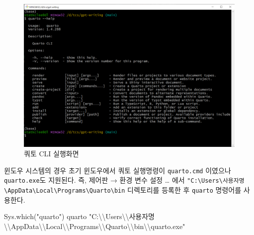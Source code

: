 \documentclass[
  letterpaper,
]{book}
\newenvironment{Shaded}{\begin{snugshade}}{\end{snugshade}}
\newcommand{\FunctionTok}[1]{\textcolor[rgb]{0.28,0.35,0.67}{#1}}
\newcommand{\NormalTok}[1]{\textcolor[rgb]{0.00,0.23,0.31}{#1}}
\newcommand{\SpecialCharTok}[1]{\textcolor[rgb]{0.37,0.37,0.37}{#1}}
\newcommand{\StringTok}[1]{\textcolor[rgb]{0.13,0.47,0.30}{#1}}
\begin{document}
\begin{figure}

{\centering \includegraphics{images/quarto-cli.png}

}

\caption{쿼토 CLI 실행화면}

\end{figure}

\begin{tcolorbox}[enhanced jigsaw, opacityback=0, opacitybacktitle=0.6, colback=white, rightrule=.15mm, coltitle=black, colframe=quarto-callout-tip-color-frame, colbacktitle=quarto-callout-tip-color!10!white, bottomrule=.15mm, bottomtitle=1mm, breakable, title=\textcolor{quarto-callout-tip-color}{\faLightbulb}\hspace{0.5em}{힌트}, titlerule=0mm, leftrule=.75mm, toptitle=1mm, left=2mm, arc=.35mm, toprule=.15mm]

윈도우 시스템의 경우 초기 윈도우에서 쿼토 실행명령이 \texttt{quarto.cmd}
이였으나 \texttt{quarto.exe}도 지원된다. 즉, 제어판 → 환경 변수 설정
\ldots{} 에서
\texttt{"C:\textbackslash{}Users\textbackslash{}사용자명\textbackslash{}AppData\textbackslash{}Local\textbackslash{}Programs\textbackslash{}Quarto\textbackslash{}bin}
디렉토리를 등록한 후 \texttt{quarto} 명령어를 사용한다.

\begin{Shaded}
\begin{Highlighting}[]
\FunctionTok{Sys.which}\NormalTok{(}\StringTok{"quarto"}\NormalTok{)}
\NormalTok{                                                                  quarto }
\StringTok{"C:}\SpecialCharTok{\textbackslash{}\textbackslash{}}\StringTok{Users}\SpecialCharTok{\textbackslash{}\textbackslash{}}\StringTok{사용자명}\SpecialCharTok{\textbackslash{}\textbackslash{}}\StringTok{AppData}\SpecialCharTok{\textbackslash{}\textbackslash{}}\StringTok{Local}\SpecialCharTok{\textbackslash{}\textbackslash{}}\StringTok{Programs}\SpecialCharTok{\textbackslash{}\textbackslash{}}\StringTok{Quarto}\SpecialCharTok{\textbackslash{}\textbackslash{}}\StringTok{bin}\SpecialCharTok{\textbackslash{}\textbackslash{}}\StringTok{quarto.exe"} 
\end{Highlighting}
\end{Shaded}

\end{tcolorbox}
\end{document}
